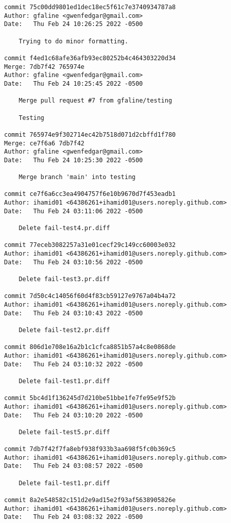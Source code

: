 {\begin{verbatim}
commit 75c00dd9801ed1dec18ec5f61c7e3740934787a8
Author: gfaline <gwenfedgar@gmail.com>
Date:   Thu Feb 24 10:26:25 2022 -0500

    Trying to do minor formatting.

commit f4ed1c68afe36afb93ec80252b4c464303220d34
Merge: 7db7f42 765974e
Author: gfaline <gwenfedgar@gmail.com>
Date:   Thu Feb 24 10:25:45 2022 -0500

    Merge pull request #7 from gfaline/testing
    
    Testing

commit 765974e9f302714ec42b7518d071d2cbffd1f780
Merge: ce7f6a6 7db7f42
Author: gfaline <gwenfedgar@gmail.com>
Date:   Thu Feb 24 10:25:30 2022 -0500

    Merge branch 'main' into testing

commit ce7f6a6cc3ea4904757f6e10b9670d7f453eadb1
Author: ihamid01 <64386261+ihamid01@users.noreply.github.com>
Date:   Thu Feb 24 03:11:06 2022 -0500

    Delete fail-test4.pr.diff

commit 77eceb3082257a31e01cecf29c149cc60003e032
Author: ihamid01 <64386261+ihamid01@users.noreply.github.com>
Date:   Thu Feb 24 03:10:56 2022 -0500

    Delete fail-test3.pr.diff

commit 7d50c4c14056f60d4f83cb59127e9767a04b4a72
Author: ihamid01 <64386261+ihamid01@users.noreply.github.com>
Date:   Thu Feb 24 03:10:43 2022 -0500

    Delete fail-test2.pr.diff

commit 806d1e708e16a2b1c1cfca8851b57a4c8e0868de
Author: ihamid01 <64386261+ihamid01@users.noreply.github.com>
Date:   Thu Feb 24 03:10:32 2022 -0500

    Delete fail-test1.pr.diff

commit 5bc4d1f136245d7d210be51bbe1fe7fe95e9f52b
Author: ihamid01 <64386261+ihamid01@users.noreply.github.com>
Date:   Thu Feb 24 03:10:20 2022 -0500

    Delete fail-test5.pr.diff

commit 7db7f42f7fa8ebf938f933b3aa698f5fc0b369c5
Author: ihamid01 <64386261+ihamid01@users.noreply.github.com>
Date:   Thu Feb 24 03:08:57 2022 -0500

    Delete fail-test1.pr.diff

commit 8a2e548582c151d2e9ad15e2f93af5638905826e
Author: ihamid01 <64386261+ihamid01@users.noreply.github.com>
Date:   Thu Feb 24 03:08:32 2022 -0500


\end{verbatim}}
